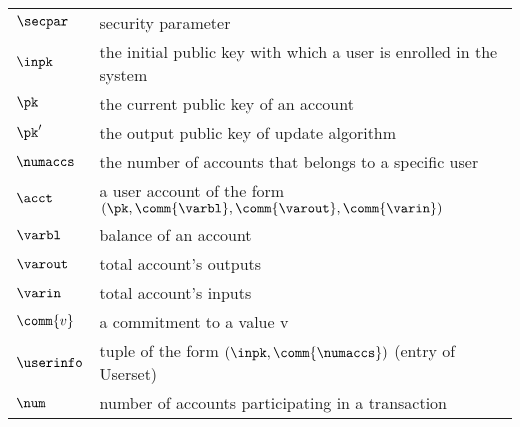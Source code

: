 \begin{center}
    \begin{tabular}{ |l l| } 
     \hline
     $\secpar$ & security parameter \\ 
     $\inpk$ & the initial public key with which a user is enrolled in the system \\ 
     $\pk$ & the current public key of an account \\ 
     $\pk'$ & the output public key of update algorithm \\
     $\numaccs$ & the number of accounts that belongs to a specific user\\ 
     $\acct$ & a user account of the form $(\pk, \comm{\varbl}, \comm{\varout}, \comm{\varin})$ \\
     $\varbl$ & balance of an account \\
     $\varout$ & total account's outputs \\
     $\varin$ & total account's inputs \\
     $\comm{v}$ & a commitment to a value v \\ 
     $\userinfo$ & tuple of the form $(\inpk, \comm{\numaccs})$ (entry of Userset) \\
     $\num$ & number of accounts participating in a transaction \\
     \hline
    \end{tabular}
\end{center}